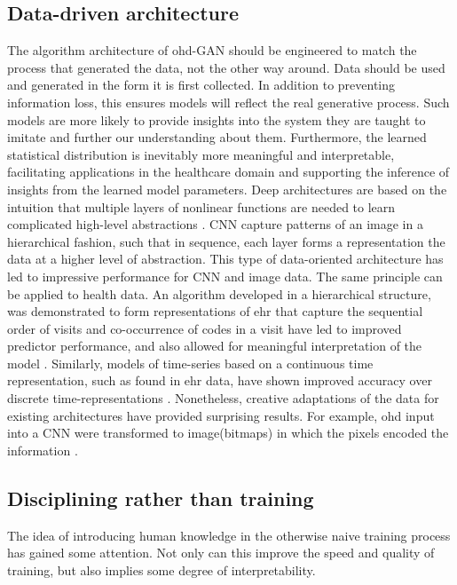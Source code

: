 \subsection{Data-driven architecture}\label{sec:archi}
The algorithm architecture of \gls{ohd}-GAN should be engineered to match the process that generated the data, not the other way around. Data should be used and generated in the form it is first collected. In addition to preventing information loss, this ensures models will reflect the real generative process. Such models are more likely to provide insights into the system they are taught to imitate and further our understanding about them. Furthermore, the learned statistical distribution is inevitably more meaningful and interpretable, facilitating applications in the healthcare domain and supporting the inference of insights from the learned model parameters.
Deep architectures are based on the intuition that multiple layers of nonlinear functions are needed to learn complicated high-level abstractions \cite{Bengio_2009}. CNN capture patterns of an image in a hierarchical fashion, such that in sequence, each layer forms a representation the data at a higher level of abstraction. This type of data-oriented architecture has led to impressive performance for CNN and image data. The same principle can be applied to health data. An algorithm developed in a hierarchical structure, was demonstrated to form representations of \gls{ehr} that capture the sequential order of visits and co-occurrence of codes in a visit have led to improved predictor performance, and also allowed for meaningful interpretation of the model \cite{choi2016multi}. Similarly, models of time-series based on a continuous time representation, such as found in \gls{ehr} data, have shown improved accuracy over discrete time-representations \cite{rubanova2019latent,de2019gru}. Nonetheless, creative adaptations of the data for existing architectures have provided surprising results. For example, \gls{ohd} input into a CNN were transformed to image(bitmaps) in which the pixels encoded the information \cite{Fukae2020}.
\subsection{Disciplining rather than training}
The idea of introducing human knowledge in the otherwise naive training process has gained some attention. Not only can this improve the speed and quality of training, but also implies some degree of interpretability.
